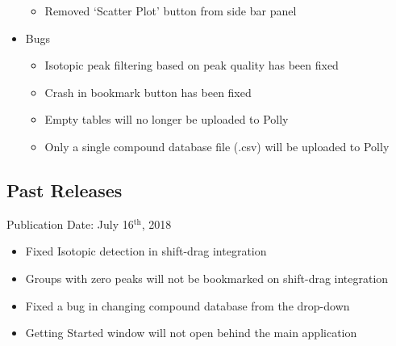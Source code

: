 \documentclass[letterpaper,10pt,english,openany,oneside]{sphinxmanual}
\begin{document}
\begin{itemize}
\begin{itemize}
\item {} 
Removed ‘Scatter Plot’ button from side bar panel

\end{itemize}

\item {} 
Bugs
\begin{itemize}
\item {} 
Isotopic peak filtering based on peak quality has been fixed 

\item {} 
Crash in bookmark button has been fixed 

\item {} 
Empty tables will no longer be uploaded to Polly 

\item {} 
Only a single compound database file (.csv) will be uploaded to Polly

\end{itemize}

\end{itemize}


\subsection{Past Releases}
\label{\detokenize{ReleaseHistory:past-releases}}

Publication Date: July 16$^{\text{th}}$, 2018
\begin{itemize}
\item {} 
Fixed Isotopic detection in shift-drag integration 

\item {} 
Groups with zero peaks will not be bookmarked on shift-drag integration

\item {} 
Fixed a bug in changing compound database from the drop-down

\item {} 
Getting Started window will not open behind the main application 

\end{itemize}
\end{document}
